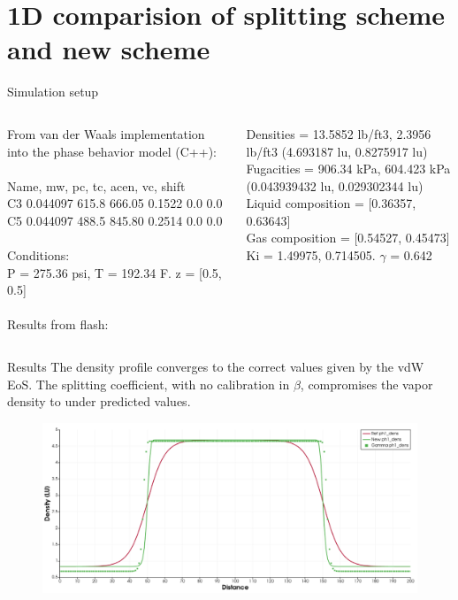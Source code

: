 \documentclass[8pt]{beamer}
\begin{document}
	\section{1D comparision of splitting scheme and new scheme}
	\begin{frame}{Simulation setup}
		
		\begin{columns}
			
			From van der Waals implementation into the phase behavior model (C++):\\~\\
			
			Name, mw, pc, tc, acen, vc, shift\\
			C3 0.044097 615.8 666.05 0.1522 0.0 0.0\\
			C5 0.044097 488.5 845.80 0.2514 0.0 0.0\\~\\
			
			Conditions:\\
			P = 275.36 psi, T = 192.34 F. z = [0.5, 0.5]\\~\\
			
			Results from flash:
			
			Densities = 13.5852 lb/ft3, 2.3956 lb/ft3 (4.693187 lu, 0.8275917 lu)\\
			Fugacities = 906.34 kPa, 604.423 kPa (0.043939432 lu, 0.029302344 lu)\\
			Liquid composition = [0.36357, 0.63643]\\
			Gas composition = [0.54527, 0.45473]\\
			Ki = 1.49975, 0.714505. $\gamma$ = 0.642
			
		\end{columns}
		
	\end{frame}


	\begin{frame}{Results}
		The density profile converges to the correct values given by the vdW EoS. The splitting coefficient, with no calibration in $\beta$, compromises the vapor density to under predicted values.
		\begin{figure}
			\centering
			\includegraphics[width=\textwidth]{pics/1dnewForce/density.png}
		\end{figure}
	\end{frame}
	
\end{document}
